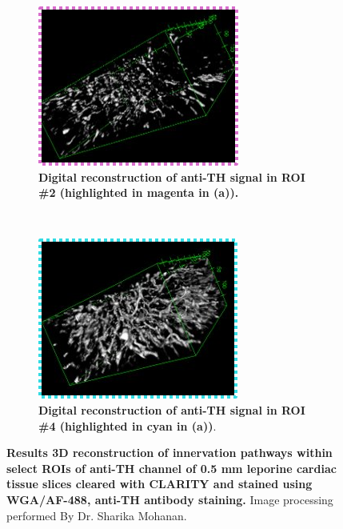 \begin{figure}[H]
    \begin{subfigure}[f]{0.475\textwidth}
    \centering
    \includegraphics[width=1\linewidth]{Images/antith_roi1.png}
    \caption{\textbf{Digital reconstruction of anti-TH signal in ROI \#2 (highlighted in magenta in (a)).}}
    \end{subfigure}
    \medskip
    ~
    \begin{subfigure}[g]{0.475\textwidth}
    \centering
    \includegraphics[width=1\linewidth]{Images/antith_roi2.png}
    \caption{\textbf{Digital reconstruction of anti-TH signal in ROI \#4 (highlighted in cyan in (a))}.}
    \end{subfigure}
    \medskip
    
    \caption{\textbf{Results 3D reconstruction of innervation pathways within select ROIs of anti-TH channel of 0.5 mm leporine cardiac tissue slices cleared with CLARITY and stained using WGA/AF-488, anti-TH antibody staining.} Image processing performed By Dr. Sharika Mohanan.}
\end{figure}


